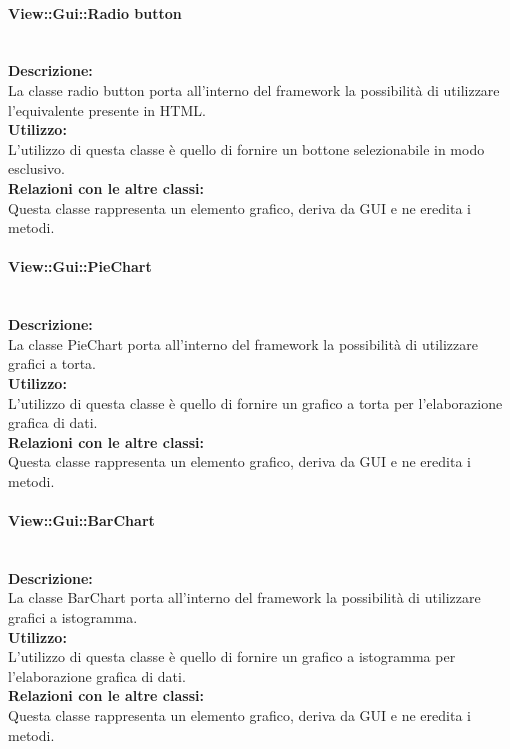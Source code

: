 \paragraph{View::Gui::Radio button}\label{gui-radio}\mbox{}\\
\textbf{Descrizione:}\\
La classe radio button porta all'interno del framework la possibilità di utilizzare l'equivalente presente in HTML.\\
\textbf{Utilizzo:}\\
L'utilizzo di questa classe è quello di fornire un bottone selezionabile in modo esclusivo.\\
\textbf{Relazioni con le altre classi:}\\
Questa classe rappresenta un elemento grafico, deriva da GUI e ne eredita i metodi.\\

\paragraph{View::Gui::PieChart}\label{gui-pie}\mbox{}\\
\textbf{Descrizione:}\\
La classe PieChart porta all'interno del framework la possibilità di utilizzare grafici a torta.\\
\textbf{Utilizzo:}\\
L'utilizzo di questa classe è quello di fornire un grafico a torta per l'elaborazione grafica di dati.\\
\textbf{Relazioni con le altre classi:}\\
Questa classe rappresenta un elemento grafico, deriva da GUI e ne eredita i metodi.\\

\paragraph{View::Gui::BarChart}\label{gui-bar}\mbox{}\\
\textbf{Descrizione:}\\
La classe BarChart porta all'interno del framework la possibilità di utilizzare grafici a istogramma.\\
\textbf{Utilizzo:}\\
L'utilizzo di questa classe è quello di fornire un grafico a istogramma per l'elaborazione grafica di dati.\\
\textbf{Relazioni con le altre classi:}\\
Questa classe rappresenta un elemento grafico, deriva da GUI e ne eredita i metodi.\\